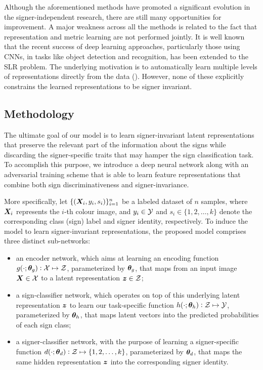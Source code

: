 Although the aforementioned methods have promoted a significant evolution in the signer-independent research, there are still many opportunities for improvement. A major weakness across all the methods is related to the fact that representation and metric learning are not performed jointly. It is well known that the recent success of deep learning approaches, particularly those using CNNs, in tasks like object detection and recognition, has been extended to the SLR problem. The underlying motivation is to automatically learn multiple levels of representations directly from the data (\citet{Pigou2015, Koller2016, Wu2016, Neverova2016, Kumar2017}). However, none of these explicitly constrains the learned representations to be signer invariant.

\subsection{Methodology}
\label{sec:adv_signer_inv_method}

The ultimate goal of our model is to learn signer-invariant latent representations that preserve the relevant part of the information about the signs while discarding the signer-specific traits that may hamper the sign classification task. To accomplish this purpose, we introduce a deep neural network along with an adversarial training scheme that is able to learn feature representations that combine both sign discriminativeness and signer-invariance.

More specifically, let $\{({\bm{X}}_{i},y_{i},s_{i})\}_{i=1}^{n}$ be a labeled dataset of $n$ samples, where ${\bm{X}}_{i}$ represents the $i$-th colour image, and $y_{i} \in {\mathcal{Y}}$ and $s_{i} \in \{1,2,\dots,k\}$ denote the corresponding class (sign) label and signer identity, respectively. To induce the model to learn signer-invariant representations, the proposed model comprises three distinct sub-networks:
\begin{itemize}
    \item an encoder network, which aims at learning an encoding function $g(\cdot;{\bm{\theta}}_g): {\mathcal{X}} \mapsto {\mathcal{Z}}$, parameterized by ${\bm{\theta}}_g$, that maps from an input image ${\bm{X}} \in {\mathcal{X}}$ to a latent representation ${\bm{z}} \in {\mathcal{Z}}$;
    \item a sign-classifier network, which operates on top of this underlying latent representation ${\bm{z}}$ to learn our task-specific function $h(\cdot; {\bm{\theta}}_h): {\mathcal{Z}} \mapsto {\mathcal{Y}}$, parameterized by ${\bm{\theta}}_h$, that maps latent vectors into the predicted probabilities of each sign class;
    \item a signer-classifier network, with the purpose of learning a signer-specific function $d(\cdot; {\bm{\theta}}_d): {\mathcal{Z}} \mapsto \{1,2,\dots,k\}$, parameterized by ${\bm{\theta}}_d$, that maps the same hidden representation ${\bm{z}}$ into the corresponding signer identity.
\end{itemize}

